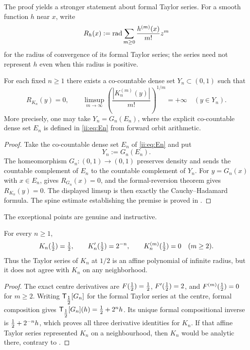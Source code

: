 The proof yields a stronger statement about formal Taylor series.  For a smooth
function $h$ near $x$, write
\[
 R_h(x):=\operatorname{rad}\sum_{m\geq0}\frac{h^{(m)}(x)}{m!}z^m
\]
for the radius of convergence of its formal Taylor series; the series need not
represent $h$ even when this radius is positive.

\begin{theorem}
\label{ii:thm:inverse-strong}
For each fixed $n\geq1$ there exists a co-countable dense set
$Y_n\subset(0,1)$ such that
\begin{equation}
 R_{K_n}(y)=0,
 \qquad
 \limsup_{m\to\infty}
 \left(\frac{|K_n^{(m)}(y)|}{m!}\right)^{1/m}=+\infty
 \quad(y\in Y_n).
 \label{ii:eq:inverse-zero-radius}
\end{equation}
More precisely, one may take $Y_n=G_n(E_n)$, where the explicit co-countable dense set
$E_n$ is defined in \eqref{ii:eq:En} from forward orbit arithmetic.
\end{theorem}

\begin{proof}
Take the co-countable dense set $E_n$ of \eqref{ii:eq:En} and put
\begin{equation}
 Y_n:=G_n(E_n).
 \label{ii:eq:Yn}
\end{equation}
The homeomorphism $G_n:(0,1)\to(0,1)$ preserves density and
sends the countable complement of $E_n$ to the countable complement of
$Y_n$.  For $y=G_n(x)$ with $x\in E_n$,  gives
$R_{G_n}(x)=0$, and the formal-reversion theorem
 gives $R_{K_n}(y)=0$.  The displayed limsup is
then exactly the Cauchy--Hadamard formula.  The spine estimate establishing
the premise is proved in .
\end{proof}

The exceptional points are genuine and instructive.

\begin{theorem}
\label{ii:thm:center-jet}
For every $n\geq1$,
\begin{equation}
 K_n(\tfrac12)=\tfrac12,\qquad K_n'(\tfrac12)=2^{-n},\qquad
 K_n^{(m)}(\tfrac12)=0\quad(m\geq2).
 \label{ii:eq:center-jet}
\end{equation}
Thus the Taylor series of $K_n$ at $1/2$ is an affine polynomial of infinite radius,
but it does not agree with $K_n$ on any neighborhood.
\end{theorem}

\begin{proof}
The exact centre derivatives are
$F(\tfrac12)=\tfrac12$, $F'(\tfrac12)=2$, and $F^{(m)}(\tfrac12)=0$ for $m\ge2$.
Writing $\mathsf T_{\tfrac12}[G_n]$ for the formal Taylor series at the centre,
formal composition gives
$\mathsf T_{\tfrac12}[G_n](h)=\tfrac12+2^nh$.  Its unique formal compositional inverse
is $\tfrac12+2^{-n}h$, which proves all three derivative identities for $K_n$.
If that affine Taylor series represented $K_n$ on a neighbourhood, then
$K_n$ would be analytic there, contrary to .
\end{proof}


